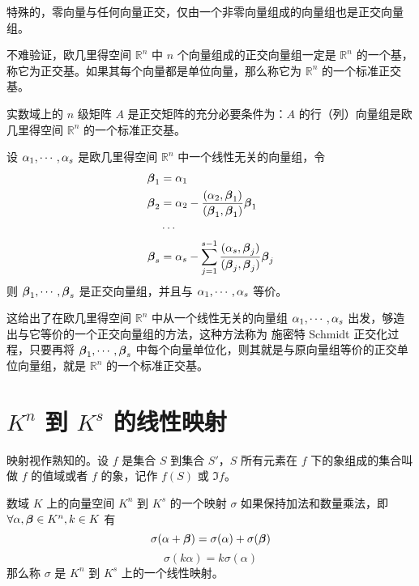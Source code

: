 特殊的，零向量与任何向量正交，仅由一个非零向量组成的向量组也是正交向量组。

不难验证，欧几里得空间 $\mathbb{R}^n$ 中 $n$ 个向量组成的正交向量组一定是 $\mathbb{R}^n$ 的一个基，称它为正交基。如果其每个向量都是单位向量，那么称它为 $\mathbb{R}^n$ 的一个标准正交基。

\begin{theorem}
	实数域上的 $n$ 级矩阵 $A$ 是正交矩阵的充分必要条件为：$A$ 的行（列）向量组是欧几里得空间 $\mathbb{R}^n$ 的一个标准正交基。
\end{theorem}

\begin{theorem}
	设 $\alpha_1,\cdots,\alpha_s$ 是欧几里得空间 $\mathbb{R}^n$ 中一个线性无关的向量组，令
	\[
		\begin{aligned}
			\boldsymbol{\beta}_1 & =\alpha_1                                                                                               \\
			\boldsymbol{\beta}_2 & =\alpha_2 - \frac{(\alpha_2,\boldsymbol{\beta}_1)}{(\boldsymbol{\beta}_1,\boldsymbol{\beta}_1)}\boldsymbol{\beta}_1                 \\
			              & \cdots                                                                                                  \\
			\boldsymbol{\beta}_s & = \alpha_s-\sum_{j=1}^{s-1}\frac{(\alpha_s,\boldsymbol{\beta}_j)}{(\boldsymbol{\beta}_j,\boldsymbol{\beta}_j)}\boldsymbol{\beta}_j
		\end{aligned}
	\]
	则 $\boldsymbol{\beta}_1,\cdots,\boldsymbol{\beta}_s$ 是正交向量组，并且与 $\alpha_1,\cdots,\alpha_s$ 等价。
\end{theorem}

这给出了在欧几里得空间 $\mathbb{R}^n$ 中从一个线性无关的向量组 $\alpha_1,\cdots,\alpha_s$ 出发，够造出与它等价的一个正交向量组的方法，这种方法称为 施密特 Schmidt 正交化过程，只要再将 $\boldsymbol{\beta}_1,\cdots,\boldsymbol{\beta}_s$ 中每个向量单位化，则其就是与原向量组等价的正交单位向量组，就是 $\mathbb{R}^n$ 的一个标准正交基。

\section{\texorpdfstring{$K^n$ 到 $K^s$ 的线性映射}{Kn 到 Ks 的线性映射}}

映射视作熟知的。设 $f$ 是集合 $S$ 到集合 $S'$，$S$ 所有元素在 $f$ 下的象组成的集合叫做 $f$ 的值域或者 $f$ 的象，记作 $f(S)$ 或 $\Im f$。

\begin{definition}
	数域 $K$ 上的向量空间 $K^n$ 到 $K^s$ 的一个映射 $\sigma$ 如果保持加法和数量乘法，即 $\forall \alpha,\boldsymbol{\beta} \in K^n,k\in K$ 有
	\[\sigma (\alpha+\boldsymbol{\beta}) = \sigma(\alpha) + \sigma(\boldsymbol{\beta})\]
	\[\sigma(k\alpha) = k\sigma(\alpha)\]
	那么称 $\sigma$ 是 $K^n$ 到 $K^s$ 上的一个线性映射。
\end{definition}

